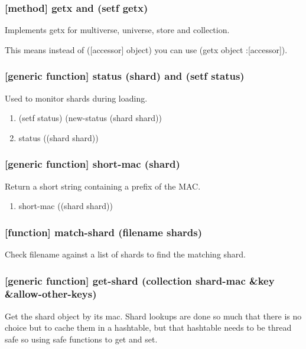 \documentclass[11pt]{article}
\begin{document}
\subsubsection{[method] getx and (setf getx)}
\label{sec:orgc3f05ef}

Implements getx for multiverse, universe, store and collection.

This means instead of ([accessor] object) you can use (getx object :[accessor]).

\subsubsection{[generic function] status (shard) and (setf status)}
\label{sec:orgfd4c0fa}

Used to monitor shards during loading.

\begin{enumerate}
\item (setf status) (new-status (shard shard))
\label{sec:orge320acc}

\item status ((shard shard))
\label{sec:orgd5365ef}
\end{enumerate}

\subsubsection{[generic function] short-mac (shard)}
\label{sec:orgf999d9e}

Return a short string containing a prefix of the MAC.

\begin{enumerate}
\item short-mac ((shard shard))
\label{sec:orgb37a180}
\end{enumerate}

\subsubsection{[function] match-shard (filename shards)}
\label{sec:orgad43359}

Check filename against a list of shards to find the matching shard.

\subsubsection{[generic function] get-shard (collection shard-mac \&key \&allow-other-keys)}
\label{sec:org7a06b92}

Get the shard object by its mac. Shard lookups are done so much that
there is no choice but to cache them in a hashtable, but that
hashtable needs to be thread safe so using safe functions to get and
set.
\end{document}
